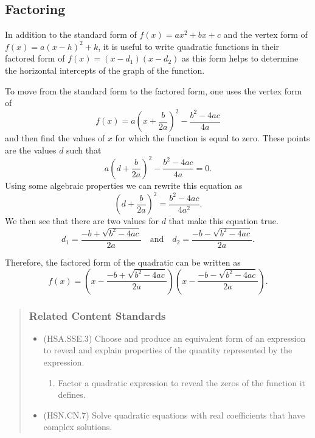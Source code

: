 \documentclass[
]{book}
\providecommand{\tightlist}{%
  \setlength{\itemsep}{0pt}\setlength{\parskip}{0pt}}
\theoremstyle{definition}
\theoremstyle{definition}
\theoremstyle{definition}
\theoremstyle{remark}
\begin{document}
\hypertarget{factoring}{%
\subsection{Factoring}\label{factoring}}

In addition to the standard form of \(f(x)=ax^2+bx+c\) and the vertex form of \(f(x)=a(x-h)^2+k\), it is useful to write quadratic functions in their factored form of \(f(x)=(x-d_1)(x-d_2)\) as this form helps to determine the horizontal intercepts of the graph of the function.

To move from the standard form to the factored form, one uses the vertex form of \[f(x) = a \left(x+\frac{b}{2a}  \right)^2- \frac{b^2-4ac}{4a}\] and then find the values of \(x\) for which the function is equal to zero. These points are the values \(d\) such that
\[a\left(d+\frac{b}{2a}  \right)^2- \frac{b^2-4ac}{4a}=0.\] Using some algebraic properties we can rewrite this equation as \[\left(d+\frac{b}{2a}  \right)^2= \frac{b^2-4ac}{4a^2}.\]
We then see that there are two values for \(d\) that make this equation true.
\[d_1 = \frac{-b+\sqrt{b^2-4ac}}{2a} \quad \mbox{and} \quad d_2 = \frac{-b-\sqrt{b^2-4ac}}{2a}.\]

Therefore, the factored form of the quadratic can be written as
\[f(x) = \left( x- \frac{-b+\sqrt{b^2-4ac}}{2a}\right) \left(x- \frac{-b-\sqrt{b^2-4ac}}{2a}\right).\]

\begin{quote}
\hypertarget{related-content-standards-49}{%
\subsubsection*{Related Content Standards}\label{related-content-standards-49}}

\begin{itemize}
\tightlist
\item
  (HSA.SSE.3) Choose and produce an equivalent form of an expression to reveal and explain properties of the quantity represented by the expression.

  \begin{enumerate}
  \def\labelenumi{\alph{enumi}.}
  \tightlist
  \item
    Factor a quadratic expression to reveal the zeros of the function it defines.
  \end{enumerate}
\item
  (HSN.CN.7) Solve quadratic equations with real coefficients that have complex solutions.
\end{itemize}
\end{quote}
\end{document}
